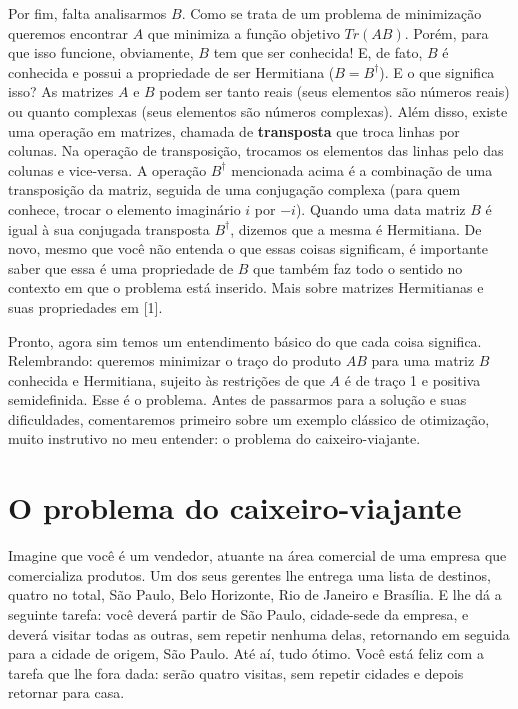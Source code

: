 \documentclass[11pt]{article}
\begin{document}
Por fim, falta analisarmos \(B\). Como se trata de um problema de
minimização queremos encontrar \(A\) que minimiza a função objetivo
\(Tr(AB)\). Porém, para que isso funcione, obviamente, \(B\) tem que ser
conhecida! E, de fato, \(B\) é conhecida e possui a propriedade de ser
Hermitiana (\(B = B^{\dagger}\)). E o que significa isso? As matrizes
\(A\) e \(B\) podem ser tanto reais (seus elementos são números reais)
ou quanto complexas (seus elementos são números complexas). Além disso,
existe uma operação em matrizes, chamada de \textbf{transposta} que
troca linhas por colunas. Na operação de transposição, trocamos os
elementos das linhas pelo das colunas e vice-versa. A operação
\(B^{\dagger}\) mencionada acima é a combinação de uma transposição da
matriz, seguida de uma conjugação complexa (para quem conhece, trocar o
elemento imaginário \(i\) por \(-i\)). Quando uma data matriz \(B\) é
igual à sua conjugada transposta \(B^{\dagger}\), dizemos que a mesma é
Hermitiana. De novo, mesmo que você não entenda o que essas coisas
significam, é importante saber que essa é uma propriedade de \(B\) que
também faz todo o sentido no contexto em que o problema está inserido.
Mais sobre matrizes Hermitianas e suas propriedades em {[}1{]}.

Pronto, agora sim temos um entendimento básico do que cada coisa
significa. Relembrando: queremos minimizar o traço do produto \(AB\)
para uma matriz \(B\) conhecida e Hermitiana, sujeito às restrições de
que \(A\) é de traço 1 e positiva semidefinida. Esse é o problema. Antes
de passarmos para a solução e suas dificuldades, comentaremos primeiro
sobre um exemplo clássico de otimização, muito instrutivo no meu
entender: o problema do caixeiro-viajante.

    \hypertarget{o-problema-do-caixeiro-viajante}{%
\section{O problema do caixeiro-viajante}\label{o-problema-do-caixeiro-viajante}}

    Imagine que você é um vendedor, atuante na área comercial de uma empresa
que comercializa produtos. Um dos seus gerentes lhe entrega uma lista de
destinos, quatro no total, São Paulo, Belo Horizonte, Rio de Janeiro e
Brasília. E lhe dá a seguinte tarefa: você deverá partir de São Paulo,
cidade-sede da empresa, e deverá visitar todas as outras, sem repetir
nenhuma delas, retornando em seguida para a cidade de origem, São Paulo.
Até aí, tudo ótimo. Você está feliz com a tarefa que lhe fora dada:
serão quatro visitas, sem repetir cidades e depois retornar para casa.
\end{document}
